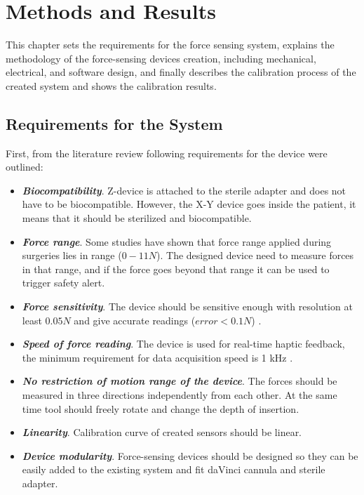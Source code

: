 \chapter{Methods and Results}
\label{methods} %
This chapter sets the requirements for the force sensing system, explains the methodology of the force-sensing devices creation, including mechanical, electrical, and software design, and finally describes the calibration process of the created system and shows the calibration results. 

\section{Requirements for the System}
	\label{sec:DevReq}
		
	First, from the literature review following requirements for the device were outlined:
\begin{itemize}
    \item \textbf{\textit{Biocompatibility}}. Z-device is attached to the sterile adapter and does not have to be biocompatible. However, the X-Y device goes inside the patient, it means that it should be sterilized and biocompatible.
    
    \item \textbf{\textit{Force range}}. Some studies \cite{mack_interactive_2012, prasad_modular_2003 } have shown that force range applied during surgeries lies in range ($0-11 N$). The designed device need to measure forces in that range, and if the force goes beyond that range it can be used to trigger safety alert.
    
    \item \textbf{\textit{Force sensitivity}}. The device should be sensitive enough with resolution at least $0.05 N$ and give accurate readings ($error < 0.1 N$) \cite{mack_interactive_2012}.
    
    \item \textbf{\textit{Speed of force reading}}. The device is used for real-time haptic feedback, the minimum requirement for data acquisition speed is 1 kHz \cite{seungmoon_choi_effect_2004}.
    
    \item \textbf{\textit{No restriction of motion range of the device}}. The forces should be measured in three directions independently from each other. At the same time tool should freely rotate and change the depth of insertion.    
    
    \item \textbf{\textit{Linearity}}. Calibration curve of created sensors should be linear.

    \item \textbf{\textit{Device modularity}}. Force-sensing devices should be designed so they can be easily added to the existing system and fit daVinci cannula and sterile adapter.
\end{itemize}


